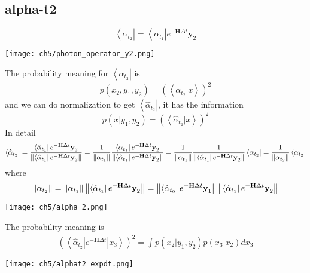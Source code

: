 \subsection{alpha-t2}
\begin{definition}
\begin{equation}
        \left< \alpha_{t_2} \right| = \left< \alpha_{t_1} \right| e^{-\textbf{H}\Delta t} \textbf{y}_2     
\end{equation}
\begin{center}
        \texttt{[image: ch5/photon\_operator\_y2.png]}   
\end{center}
The probability meaning for $\left< \alpha_{t_2}\right|$ is 
\begin{align*}
        p(x_2, y_1, y_2) = (\left< \alpha_{t_2}| x \right>)^2
\end{align*}
and we can do normalization to get $\left< \hat{\alpha}_{t_2} \right|$, it has the information
\begin{equation}
        p(x|y_1,y_2) = (\left< \hat{\alpha}_{t_2} |x\right>)^2
\end{equation}
In detail
\begin{equation}
        \left< \hat{\alpha}_{t_2} \right| 
	= \frac{\left< \hat{\alpha}_{t_1} \right| e^{-\textbf{H}\Delta t} \textbf{y}_2}{\left\lVert\left< \hat{\alpha}_{t_1} \right| e^{-\textbf{H}\Delta t} \textbf{y}_2\right\rVert} 
	= \frac{1}{\left\lVert\alpha_{t_{1}}\right\rVert} \frac{\left< \alpha_{t_1} \right| e^{-\textbf{H}\Delta t} \textbf{y}_2}{\left\lVert\left< \hat{\alpha}_{t_1} \right| e^{-\textbf{H}\Delta t} \textbf{y}_2\right\rVert} 
	= \frac{1}{\left\lVert\alpha_{t_{1}}\right\rVert} \frac{1}{\left\lVert\left< \hat{\alpha}_{t_1} \right| e^{-\textbf{H}\Delta t} \textbf{y}_2\right\rVert} \left< \alpha_{t_2} \right| 
	= \frac{1}{\left\lVert\alpha_{t_2}\right\rVert} \left< \alpha_{t_2} \right|
\end{equation}
where
\begin{equation}
        \left\lVert\alpha_{t_2}\right\rVert = \left\lVert\alpha_{t_{1}}\right\rVert \left\lVert\left< \hat{\alpha}_{t_1} \right| e^{-\textbf{H}\Delta t} \textbf{y}_2\right\rVert 
	= \left\lVert\left < \hat{\alpha}_{t_{0}} \right| e^{-\textbf{H}\Delta t} \textbf{y}_1\right\rVert \left\lVert\left< \hat{\alpha}_{t_1} \right| e^{-\textbf{H}\Delta t} \textbf{y}_2\right\rVert
\end{equation}
\begin{center}
        \texttt{[image: ch5/alpha\_2.png]}   
\end{center}
\end{definition}

\begin{definition}
The probability meaning is 
\begin{align*}
        (\left< \hat{\alpha}_{t_2}| e^{-\textbf{H}\Delta t} | x_3 \right>)^2 = \int p(x_2 | y_1, y_2) p(x_3|x_2) dx_3  
\end{align*}
\begin{center}
        \texttt{[image: ch5/alphat2\_expdt.png]}   
\end{center}
\end{definition}

